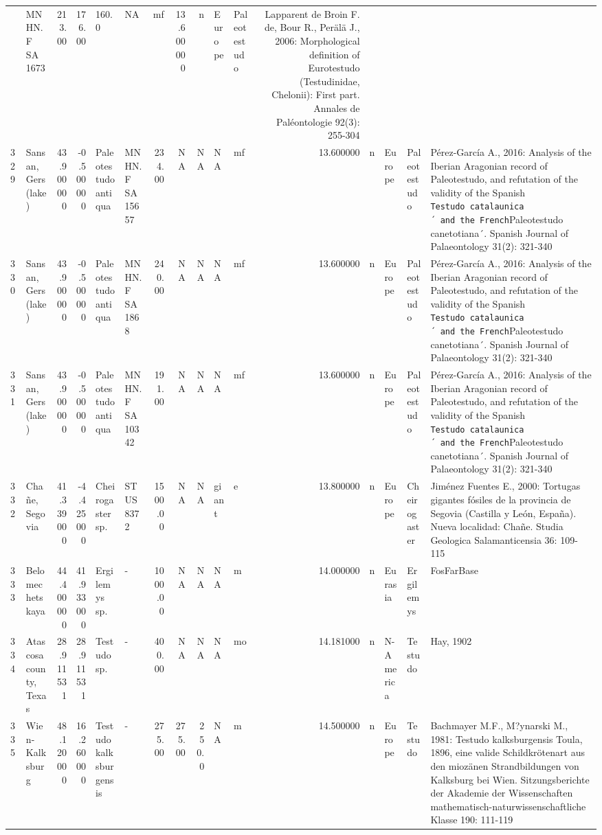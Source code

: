 \documentclass[]{article}
\begin{document}
\begin{longtable}[]{@{}llrrllrrrllrllll@{}}
& MNHN.F SA 1673 & 213.00 & 176.00 & 160.0 & NA & mf & 13.600000 & n &
Europe & Paleotestudo & Lapparent de Broin F. de, Bour R., Perälä J.,
2006: Morphological definition of Eurotestudo (Testudinidae, Chelonii):
First part. Annales de Paléontologie 92(3): 255-304\tabularnewline
329 & Sansan, Gers (lake) & 43.900000 & -0.500000 & Paleotestudo antiqua
& MNHN.F SA 15657 & 234.00 & NA & NA & NA & mf & 13.600000 & n & Europe
& Paleotestudo & Pérez-García A., 2016: Analysis of the Iberian
Aragonian record of Paleotestudo, and refutation of the validity of the
Spanish \texttt{Testudo\ catalaunica´\ and\ the\ French}Paleotestudo
canetotiana´. Spanish Journal of Palaeontology 31(2):
321-340\tabularnewline
330 & Sansan, Gers (lake) & 43.900000 & -0.500000 & Paleotestudo antiqua
& MNHN.F SA 1868 & 240.00 & NA & NA & NA & mf & 13.600000 & n & Europe &
Paleotestudo & Pérez-García A., 2016: Analysis of the Iberian Aragonian
record of Paleotestudo, and refutation of the validity of the Spanish
\texttt{Testudo\ catalaunica´\ and\ the\ French}Paleotestudo
canetotiana´. Spanish Journal of Palaeontology 31(2):
321-340\tabularnewline
331 & Sansan, Gers (lake) & 43.900000 & -0.500000 & Paleotestudo antiqua
& MNHN.F SA 10342 & 191.00 & NA & NA & NA & mf & 13.600000 & n & Europe
& Paleotestudo & Pérez-García A., 2016: Analysis of the Iberian
Aragonian record of Paleotestudo, and refutation of the validity of the
Spanish \texttt{Testudo\ catalaunica´\ and\ the\ French}Paleotestudo
canetotiana´. Spanish Journal of Palaeontology 31(2):
321-340\tabularnewline
332 & Chañe, Segovia & 41.339000 & -4.425000 & Cheirogaster sp. & STUS
8372 & 1500.00 & NA & NA & giant & e & 13.800000 & n & Europe &
Cheirogaster & Jiménez Fuentes E., 2000: Tortugas gigantes fósiles de la
provincia de Segovia (Castilla y León, España). Nueva localidad: Chañe.
Studia Geologica Salamanticensia 36: 109-115\tabularnewline
333 & Belomechetskaya & 44.400000 & 41.933000 & Ergilemys sp. & - &
1000.00 & NA & NA & NA & m & 14.000000 & n & Eurasia & Ergilemys &
FosFarBase\tabularnewline
334 & Atascosa county, Texas & 28.911531 & 28.911531 & Testudo sp. & - &
400.00 & NA & NA & NA & mo & 14.181000 & n & N-America & Testudo & Hay,
1902\tabularnewline
335 & Wien-Kalksburg & 48.120000 & 16.260000 & Testudo kalksburgensis &
- & 275.00 & 275.00 & 250.0 & NA & m & 14.500000 & n & Europe & Testudo
& Bachmayer M.F., M?ynarski M., 1981: Testudo kalksburgensis Toula,
1896, eine valide Schildkrötenart aus den miozänen Strandbildungen von
Kalksburg bei Wien. Sitzungsberichte der Akademie der Wissenschaften
mathematisch-naturwissenschaftliche Klasse 190: 111-119\tabularnewline

\end{longtable}
\end{document}
